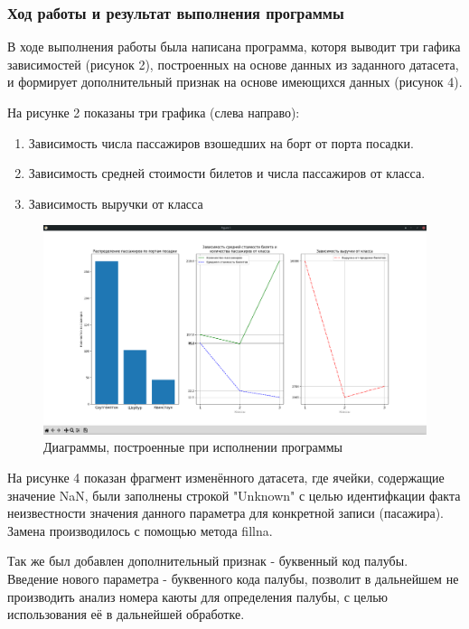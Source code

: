 \documentclass[a4paper]{article}
\begin{document}
\subsubsection{Ход работы и результат выполнения программы}
\normalsize{
    В ходе выполнения работы была написана программа, которя выводит три гафика зависимостей (рисунок 2), построенных на основе данных из заданного датасета, и формирует дополнительный признак на основе имеющихся данных (рисунок 4).
    
    На рисунке 2 показаны три графика (слева направо):
    \begin{enumerate}
        \item Зависимость числа пассажиров взошедших на борт от порта посадки.
        \item Зависимость средней стоимости билетов и числа пассажиров от класса.
        \item Зависимость выручки от класса
    \end{enumerate}
    
    \begin{figure}[h]
        \centering
        \graphicspath{{./}}
        \includegraphics[scale=0.325]{run_program_2_diagram.png}
        \caption{Диаграммы, построенные при исполнении программы}
    \end{figure} 
    
    На рисунке 4 показан фрагмент изменённого датасета, где ячейки, содержащие значение NaN, были заполнены строкой "Unknown" с целью идентифкации факта неизвестности значения данного параметра для конкретной записи (пасажира). Замена производилось с помощью метода fillna.

    Так же был добавлен дополнительный признак - буквенный код палубы. Введение нового параметра - буквенного кода палубы, позволит в дальнейшем не производить анализ номера каюты для определения палубы, с целью использования её в дальнейшей обработке.
    
}
\end{document}
